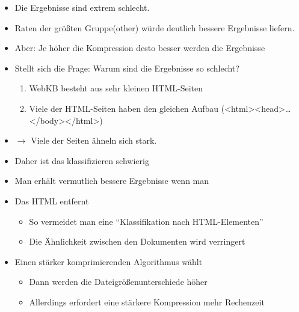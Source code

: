 \begin{frame}[c]
\begin{itemize}
  \item Die Ergebnisse sind extrem schlecht. 
  \item Raten der größten Gruppe(other) würde deutlich bessere Ergebnisse
  liefern.
  \item Aber: Je höher die Kompression desto besser werden die Ergebnisse
  \item Stellt sich die Frage: Warum sind die Ergebnisse so schlecht?
  \begin{enumerate}
  \item WebKB besteht aus sehr kleinen HTML-Seiten
  \item Viele der HTML-Seiten haben den gleichen Aufbau
  (<html><head>\ldots</body></html>)
\end{enumerate}
\item $\rightarrow$ Viele der Seiten ähneln sich stark.
\item Daher ist das klassifizieren schwierig
\end{itemize}
\end{frame}

\begin{frame}[c]
\begin{itemize}
  \item Man erhält vermutlich bessere Ergebnisse wenn man
  \item Das HTML entfernt
  \begin{itemize}
  \item So vermeidet man eine ``Klassifikation nach HTML-Elementen''
  \item Die Ähnlichkeit zwischen den Dokumenten wird verringert
\end{itemize}
\item Einen stärker komprimierenden Algorithmus wählt
\begin{itemize}
  \item Dann werden die Dateigrößenunterschiede höher
  \item Allerdings erfordert eine stärkere Kompression mehr Rechenzeit
\end{itemize}
\end{itemize}
\end{frame}

